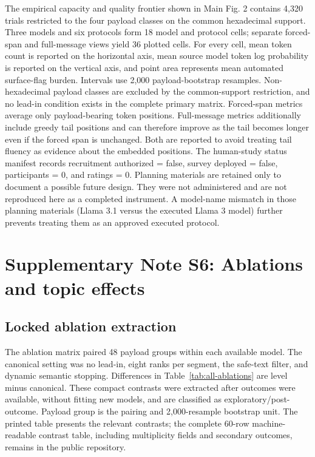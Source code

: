 \documentclass[fleqn,10pt]{wlscirep}
\begin{document}
The empirical capacity and quality frontier shown in Main Fig. 2 contains 4,320 trials restricted to the four payload classes on the common hexadecimal support. Three models and six protocols form 18 model and protocol cells; separate forced-span and full-message views yield 36 plotted cells. For every cell, mean token count is reported on the horizontal axis, mean source model token log probability is reported on the vertical axis, and point area represents mean automated surface-flag burden. Intervals use 2,000 payload-bootstrap resamples. Non-hexadecimal payload classes are excluded by the common-support restriction, and no lead-in condition exists in the complete primary matrix.
Forced-span metrics average only payload-bearing token positions. Full-message metrics additionally include greedy tail positions and can therefore improve as the tail becomes longer even if the forced span is unchanged. Both are reported to avoid treating tail fluency as evidence about the embedded positions.
The human-study status manifest records recruitment authorized = false, survey deployed = false, participants = 0, and ratings = 0. Planning materials are retained only to document a possible future design. They were not administered and are not reproduced here as a completed instrument. A model-name mismatch in those planning materials (Llama 3.1 versus the executed Llama 3 model) further prevents treating them as an approved executed protocol.


\section*{Supplementary Note S6: Ablations and topic effects}\label{si:s6}

\subsection*{Locked ablation extraction}

The ablation matrix paired 48 payload groups within each available model. The canonical setting was no lead-in, eight ranks per segment, the safe-text filter, and dynamic semantic stopping. Differences in Table~\ref{tab:all-ablations} are level minus canonical. These compact contrasts were extracted after outcomes were available, without fitting new models, and are classified as exploratory/post-outcome. Payload group is the pairing and 2,000-resample bootstrap unit. The printed table presents the relevant contrasts; the complete 60-row machine-readable contrast table, including multiplicity fields and secondary outcomes, remains in the public repository.
\end{document}
